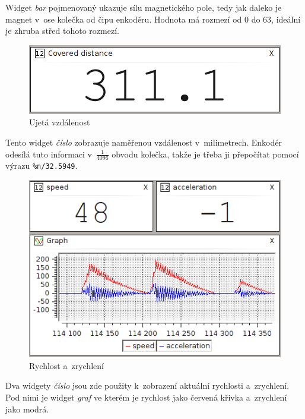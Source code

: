 \documentclass[12pt, a4paper, oneside]{article}
\newcommand{\It}{\textit}  %
\begin{document}
Widget \It{bar} pojmenovaný  ukazuje sílu magnetického pole, tedy jak daleko je magnet v~ose kolečka od čipu enkodéru. Hodnota má rozmezí od 0 do 63, ideální je zhruba střed tohoto rozmezí.

\begin{figure}[H]
\begin{center}
\includegraphics[scale=0.85]{img/enc_dist.png}
\caption{Ujetá vzdálenost}
\end{center}
\end{figure}
Tento widget \It{číslo} zobrazuje naměřenou vzdálenost v~milimetrech. Enkodér odesílá tuto informaci v~$\frac{1}{4096}$ obvodu kolečka, takže je třeba ji přepočítat pomocí výrazu \verb|%n/32.5949|.

\begin{figure}[H]
\begin{center}
\includegraphics[width=\textwidth-60pt]{img/enc_spd.png}
\caption{Rychlost a~zrychlení}
\end{center}
\end{figure}
Dva widgety \It{číslo} jsou zde použity k~zobrazení aktuální rychlosti a~zrychlení. Pod nimi je widget \It{graf} ve kterém je rychlost jako červená křivka a~zrychlení jako modrá.
\end{document}
